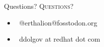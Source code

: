 \documentclass[usenames,dvipsnames, 18pt, compress, aspectratio=169]{beamer}
\def\social{{\faMastodon}}
\def\email{{\faEnvelope}}
\begin{document}

\fontsize{18pt}{18}\selectfont
\begin{frame}
  \vspace*{2.5cm}
  \begin{minipage}[b][\paperheight]{\textwidth}
  \begin{center}

      \linespread{1.0}%
      \if@noSmallCapitals%
        Questions?
      \else%
        \scshape{\color{black} Questions?}%
      \fi%
      \vspace*{0.3em}

      \fontsize{13pt}{14}\selectfont
        \begin{itemize}[label={}]
            \item {\color{black} \social\ @erthalion@fosstodon.org}
            \item {\color{black} \email\ ddolgov at redhat dot com}
        \end{itemize}
      \vspace*{2.5em}%

    \vfill
    \vspace*{2em}
  \end{center}
  \end{minipage}

\end{frame}
\end{document}
